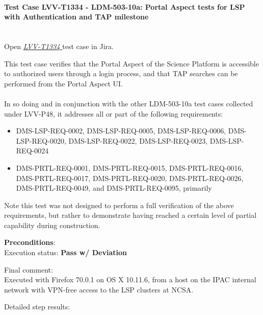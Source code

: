 \documentclass[DM,lsstdraft,STR,toc]{lsstdoc}
\providecommand{\tightlist}{
  \setlength{\itemsep}{0pt}\setlength{\parskip}{0pt}}
\begin{document}
    \paragraph{Test Case LVV-T1334 - LDM-503-10a: Portal Aspect tests for LSP with Authentication and TAP
milestone
 }\mbox{}\\

Open  \href{https://jira.lsstcorp.org/secure/Tests.jspa#/testCase/LVV-T1334}{\textit{ LVV-T1334 } }
test case in Jira.

    This test case verifies that the Portal Aspect of the Science Platform
is accessible to authorized users through a login process, and that TAP
searches can be performed from the Portal Aspect UI.\\
~\\
In so doing and in conjunction with the other LDM-503-10a test cases
collected under LVV-P48, it addresses all or part of the following
requirements:

\begin{itemize}
\tightlist
\item
  DMS-LSP-REQ-0002, DMS-LSP-REQ-0005, DMS-LSP-REQ-0006,
  DMS-LSP-REQ-0020, DMS-LSP-REQ-0022, DMS-LSP-REQ-0023, DMS-LSP-REQ-0024
\item
  DMS-PRTL-REQ-0001, DMS-PRTL-REQ-0015, DMS-PRTL-REQ-0016,
  DMS-PRTL-REQ-0017, DMS-PRTL-REQ-0020, DMS-PRTL-REQ-0026,
  DMS-PRTL-REQ-0049, and DMS-PRTL-REQ-0095, primarily
\end{itemize}

Note this test was not designed to perform a full verification of the
above requirements, but rather to demonstrate having reached a certain
level of partial capability during construction.


    \textbf{ Preconditions}:\\
    

    Execution status: {\bf Pass w/ Deviation }

    Final comment:\\Executed with Firefox 70.0.1 on OS X 10.11.6, from a host on the IPAC
internal network with VPN-free access to the LSP clusters at NCSA.



    Detailed step results:
\end{document}
